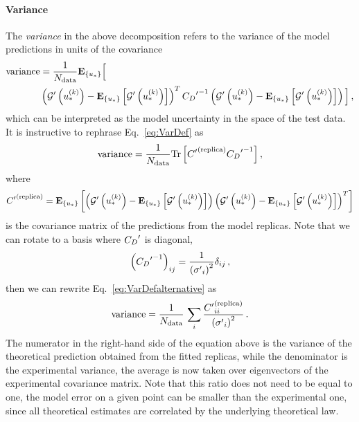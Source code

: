 \paragraph{Variance}

The {\em variance} in the above decomposition refers to the variance of the
model predictions in units of the covariance
\begin{equation}
    \label{eq:VarDef}
    \begin{split}
        {\rm variance} &= \frac{1}{N_{\rm data}}\mathbf{E}_{\{ u_* \}} \Big[ \\
            &\left( {{\mathcal{G}}^{\prime}}\left(u_*^{(k)}\right) - 
            \mathbf{E}_{\{ u_* \}} \left[ {{\mathcal{G}}^{\prime}}\left(u_*^{(k)}\right) \right] \right)^T
            {{C_{D}}^{\prime}}^{-1}
            \left( {{\mathcal{G}}^{\prime}}\left(u_*^{(k)}\right) - 
            \mathbf{E}_{\{ u_* \}} \left[ {{\mathcal{G}}^{\prime}}\left(u_*^{(k)}\right) \right] \right)
        \Big] \, ,
    \end{split}
\end{equation}
which can be interpreted as the model uncertainty in the space of the test data.
It is instructive to rephrase Eq.~\ref{eq:VarDef} as
\begin{equation}
    \label{eq:VarDefalternative}
    {\rm variance} = \frac{1}{N_{\rm data}} {\rm Tr} \left[ {{C}^{\prime}}^{(\rm replica)} {{C_{D}}^{\prime}}^{-1} \right],
\end{equation}
where 
\begin{equation}
    \label{eq:CovRep}
    {{C}^{\prime}}^{(\rm replica)} = 
    \mathbf{E}_{\{ u_* \}} \left[ 
            \left( {{\mathcal{G}}^{\prime}}\left(u_*^{(k)}\right) - 
            \mathbf{E}_{\{ u_* \}} \left[ {{\mathcal{G}}^{\prime}}\left(u_*^{(k)}\right) \right] \right)
            \left( {{\mathcal{G}}^{\prime}}\left(u_*^{(k)}\right) - 
            \mathbf{E}_{\{ u_* \}} \left[ {{\mathcal{G}}^{\prime}}\left(u_*^{(k)}\right) \right] \right)^T
         \right]
\end{equation}
is the covariance matrix of the predictions from the model replicas. Note that
we can rotate to a basis where ${{C_{D}}^{\prime}}$ is diagonal,
\begin{equation}
    \label{eq:InvCovPrimeDiag}
    \left({{C_{D}}^{\prime}}^{-1} \right)_{ij} = \frac{1}{\left({{\sigma}^{\prime}}_i\right)^2} 
    \delta_{ij}\, ,
\end{equation}
then we can rewrite Eq.~\ref{eq:VarDefalternative} as 
\begin{equation}
    \label{eq:VarianceInterpretation}
    {\rm variance} = \frac{1}{N_{\rm data}}\, \sum_i \frac{{{C}^{\prime}}^{(\rm replica)}_{ii}}{\left({{\sigma}^{\prime}}_i\right)^2}\, .
\end{equation}
The numerator in the right-hand side of the equation above is the variance of
the theoretical prediction obtained from the fitted replicas, while the
denominator is the experimental variance, the average is now taken over
eigenvectors of the experimental covariance matrix. Note that this ratio does
not need to be equal to one, the model error on a given point can be smaller
than the experimental one, since all theoretical estimates are correlated by the
underlying theoretical law. 

